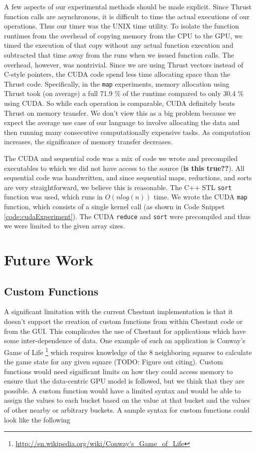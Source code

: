 \documentclass[twocolumn]{article}
\renewcommand{\|}{\origbar} %
\newcommand{\code}[1]{\texttt{#1}}
\begin{document}
A few aspects of our experimental methods should be made explicit. Since Thrust function calls are asynchronous, it is difficult to time the actual executions of our operations. Thus our timer was the UNIX time utility. To isolate the function runtimes from the overhead of copying memory from the CPU to the GPU, we timed the execution of that copy without any actual function execution and subtracted that time away from the runs when we issued function calls. The overhead, however, was nontrivial. Since we are using Thrust vectors instead of C-style pointers, the CUDA code spend less time allocating space than the Thrust code. Specifically, in the \code{map} experiments, memory allocation using Thrust took (on average) a full 71.9 \% of the runtime compared to only 30.4 \% using CUDA. So while each operation is comparable, CUDA definitely beats Thrust on memory transfer. We don't view this as a big problem because we expect the average use case of our language to involve allocating the data and then running many consecutive computationally expensive tasks. As computation increases, the significance of memory transfer decreases.

The CUDA and sequential code was a mix of code we wrote and precompiled executables to which we did not have access to the source ({\bf is this true??}). All sequential code was handwritten, and since sequential maps, reductions, and sorts are very straightforward, we believe this is reasonable. The C++ STL \code{sort} function was used, which runs in $O(nlog(n))$ time. We wrote the CUDA \code{map} function, which consists of a single kernel call (as shown in Code Snippet \ref{code:cudaExperiment}). The CUDA \code{reduce} and \code{sort} were precompiled and thus we were limited to the given array sizes. 

\section{Future Work}
\label{sec:future}

\subsection{Custom Functions}

A significant limitation with the current Chestnut implementation is that it doesn't support the creation of custom functions from within Chestnut code or from the GUI. This complicates the use of Chestnut for applications which have some inter-dependence of data. One example of such an application is Conway's Game of Life \footnote{\url{http://en.wikipedia.org/wiki/Conway's_Game_of_Life}} which requires knowledge of the 8 neighboring squares to calculate the game state for any given square (TODO: Figure out citing). Custom functions would need significant limits on how they could access memory to ensure that the data-centric GPU model is followed, but we think that they are possible. A custom function would have a limited syntax and would be able to assign the values to each bucket based on the value at that bucket and the values of other nearby or arbitrary buckets. A sample syntax for custom functions could look like the following
\end{document}
